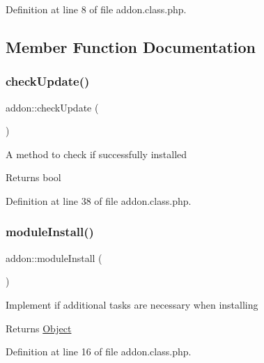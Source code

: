 Definition at line 8 of file addon.\+class.\+php.



\subsection{Member Function Documentation}
\mbox{\label{classaddon_a88804ecbcb4993b0ad3fe2ac9763f17b}} 
\subsubsection{\texorpdfstring{check\+Update()}{checkUpdate()}}
{\footnotesize\ttfamily addon\+::check\+Update (\begin{DoxyParamCaption}{ }\end{DoxyParamCaption})}

A method to check if successfully installed

\begin{DoxyReturn}{Returns}
bool 
\end{DoxyReturn}


Definition at line 38 of file addon.\+class.\+php.

\mbox{\label{classaddon_a7ac2ab52a9e9cdc5c890b38a958b74ab}} 
\subsubsection{\texorpdfstring{module\+Install()}{moduleInstall()}}
{\footnotesize\ttfamily addon\+::module\+Install (\begin{DoxyParamCaption}{ }\end{DoxyParamCaption})}

Implement if additional tasks are necessary when installing

\begin{DoxyReturn}{Returns}
\hyperlink{classObject}{Object} 
\end{DoxyReturn}


Definition at line 16 of file addon.\+class.\+php.

\mbox{\label{classaddon_af26212943701043993c73a5e81e93ca1}} 

